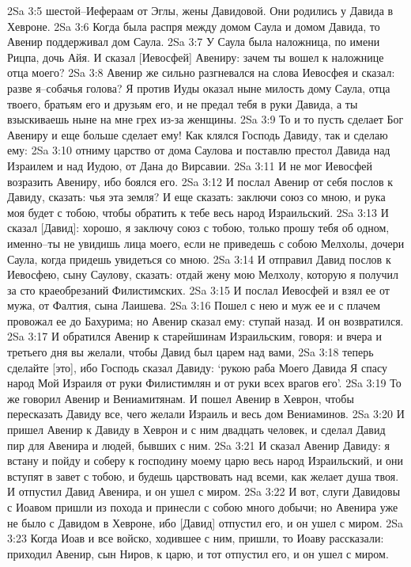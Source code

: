 2Sa 3:5  шестой--Иефераам от Эглы, жены Давидовой. Они родились у Давида в Хевроне.
2Sa 3:6  Когда была распря между домом Саула и домом Давида, то Авенир поддерживал дом Саула.
2Sa 3:7  У Саула была наложница, по имени Рицпа, дочь Айя. И сказал [Иевосфей] Авениру: зачем ты вошел к наложнице отца моего?
2Sa 3:8  Авенир же сильно разгневался на слова Иевосфея и сказал: разве я--собачья голова? Я против Иуды оказал ныне милость дому Саула, отца твоего, братьям его и друзьям его, и не предал тебя в руки Давида, а ты взыскиваешь ныне на мне грех из-за женщины.
2Sa 3:9  То и то пусть сделает Бог Авениру и еще больше сделает ему! Как клялся Господь Давиду, так и сделаю ему:
2Sa 3:10  отниму царство от дома Саулова и поставлю престол Давида над Израилем и над Иудою, от Дана до Вирсавии.
2Sa 3:11  И не мог Иевосфей возразить Авениру, ибо боялся его.
2Sa 3:12  И послал Авенир от себя послов к Давиду, сказать: чья эта земля? И еще сказать: заключи союз со мною, и рука моя будет с тобою, чтобы обратить к тебе весь народ Израильский.
2Sa 3:13  И сказал [Давид]: хорошо, я заключу союз с тобою, только прошу тебя об одном, именно--ты не увидишь лица моего, если не приведешь с собою Мелхолы, дочери Саула, когда придешь увидеться со мною.
2Sa 3:14  И отправил Давид послов к Иевосфею, сыну Саулову, сказать: отдай жену мою Мелхолу, которую я получил за сто краеобрезаний Филистимских.
2Sa 3:15  И послал Иевосфей и взял ее от мужа, от Фалтия, сына Лаишева.
2Sa 3:16  Пошел с нею и муж ее и с плачем провожал ее до Бахурима; но Авенир сказал ему: ступай назад. И он возвратился.
2Sa 3:17  И обратился Авенир к старейшинам Израильским, говоря: и вчера и третьего дня вы желали, чтобы Давид был царем над вами,
2Sa 3:18  теперь сделайте [это], ибо Господь сказал Давиду: `рукою раба Моего Давида Я спасу народ Мой Израиля от руки Филистимлян и от руки всех врагов его'.
2Sa 3:19  То же говорил Авенир и Вениамитянам. И пошел Авенир в Хеврон, чтобы пересказать Давиду все, чего желали Израиль и весь дом Вениаминов.
2Sa 3:20  И пришел Авенир к Давиду в Хеврон и с ним двадцать человек, и сделал Давид пир для Авенира и людей, бывших с ним.
2Sa 3:21  И сказал Авенир Давиду: я встану и пойду и соберу к господину моему царю весь народ Израильский, и они вступят в завет с тобою, и будешь царствовать над всеми, как желает душа твоя. И отпустил Давид Авенира, и он ушел с миром.
2Sa 3:22  И вот, слуги Давидовы с Иоавом пришли из похода и принесли с собою много добычи; но Авенира уже не было с Давидом в Хевроне, ибо [Давид] отпустил его, и он ушел с миром.
2Sa 3:23  Когда Иоав и все войско, ходившее с ним, пришли, то Иоаву рассказали: приходил Авенир, сын Ниров, к царю, и тот отпустил его, и он ушел с миром.
